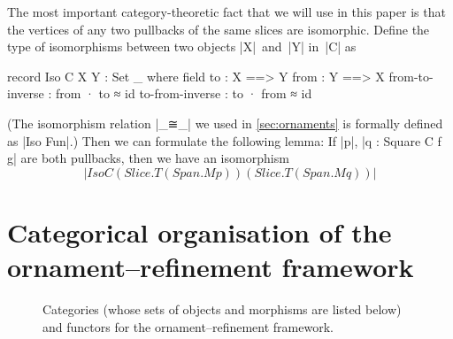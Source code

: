 The most important category-theoretic fact that we will use in this paper is that the vertices of any two pullbacks of the same slices are isomorphic.
Define the type of isomorphisms between two objects |X|~and~|Y| in~|C| as
\begin{code}
record Iso C X Y : Set _ where
  field
    to    :  X ==> Y
    from  :  Y ==> X
    from-to-inverse  :  from · to ≈ id
    to-from-inverse  :  to · from ≈ id
\end{code}
(The isomorphism relation |_≅_| we used in \autoref{sec:ornaments} is formally defined as |Iso Fun|.)
Then we can formulate the following lemma:
If |p|, |q : Square C f g| are both pullbacks, then we have an isomorphism
\[ |Iso C (Slice.T (Span.M p)) (Slice.T (Span.M q))| \]

\section{Categorical organisation of the ornament--refinement framework}
\label{sec:organisation}

\begin{figure*}
\begin{center}
\end{center}
\caption{Categories (whose sets of objects and morphisms are listed below) and functors for the ornament--refinement framework.}
\label{fig:categories}
\end{figure*}

